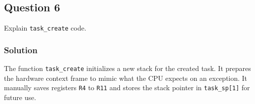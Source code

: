 \subsection*{Question 6}

Explain \texttt{task\_create} code.

\subsubsection*{Solution}

The function \texttt{task\_create} initializes a new stack for the created task.
It prepares the hardware context frame to mimic what the CPU expects on an exception.
It manually saves registers \texttt{R4} to \texttt{R11} and stores the stack pointer in \texttt{task\_sp[1]} for future use.
